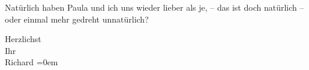 \pstart
           Natürlich haben Paula und ich uns wieder
               lieber als {\pb}je, – das ist doch
               natürlich – oder  einmal mehr gedreht
               unnatürlich?\pend
           
\pstart
           Herzlichst{\\[\baselineskip]}Ihr{\\[\baselineskip]}\spacefill\mbox{Richard}\pend
           \leftskip=0em{}\endnumbering{}  \newcommand{\dateiname}{L00591}\newcommand{\titel}{Richard Beer-Hofmann an Arthur Schnitzler, 15. 9. 1896}\newcommand{\editorInnen}{Martin Anton Müller und Gerd-Hermann Susen}
